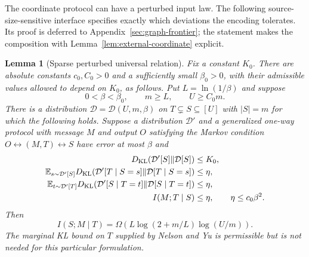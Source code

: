 \documentclass[11pt,letterpaper]{article}
\newtheorem{lemma}[theorem]{Lemma}
\numberwithin{equation}{section}
\newcommand{\E}{\mathbb E}
\begin{document}
The coordinate protocol can have a perturbed input law.
The following source-size-sensitive interface specifies exactly which deviations the encoding tolerates.
Its proof is deferred to Appendix~\ref{sec:graph-frontier}; the statement makes the composition with Lemma~\ref{lem:external-coordinate} explicit.

\begin{lemma}[Sparse perturbed universal relation]
\label{lem:sparse-perturbed-ur}
Fix a constant $K_0$.
There are absolute constants $c_0,C_0>0$ and a sufficiently small $\beta_0>0$, with their admissible values allowed to depend on $K_0$, as follows.
Put $L=\ln(1/\beta)$ and suppose
\[
 0<\beta<\beta_0,\qquad m\ge L,\qquad U\ge C_0m.
\]
There is a distribution $\mathcal D=\mathcal D(U,m,\beta)$ on $T\subsetneq S\subseteq[U]$ with $|S|=m$ for which the following holds.
Suppose a distribution $\mathcal D'$ and a generalized one-way protocol with message $M$ and output $O$ satisfying the Markov condition $O\leftrightarrow(M,T)\leftrightarrow S$ have error at most $\beta$ and
\begin{align*}
 D_{\rm KL}(\mathcal D'[S]\Vert\mathcal D[S])&\le K_0,\\
 \E_{s\sim\mathcal D'[S]}
 D_{\rm KL}(\mathcal D'[T\mid S=s]\Vert\mathcal D[T\mid S=s])
 &\le\eta,\\
 \E_{t\sim\mathcal D'[T]}
 D_{\rm KL}(\mathcal D'[S\mid T=t]\Vert\mathcal D[S\mid T=t])
 &\le\eta,\\
 I(M;T\mid S)&\le\eta,\qquad \eta\le c_0\beta^2.
\end{align*}
Then
\[
 I(S;M\mid T)
 =\Omega\!\left(L\log(2+m/L)\log(U/m)\right).
\]
The marginal KL bound on $T$ supplied by Nelson and Yu is permissible but is not needed for this particular formulation.
\end{lemma}
\end{document}
